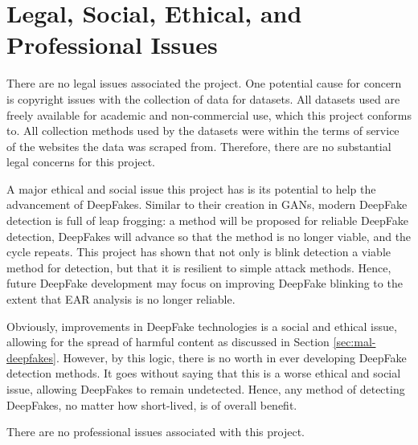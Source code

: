 \section{Legal, Social, Ethical, and Professional Issues}


There are no legal issues associated the project. One potential cause for concern is copyright issues with the collection of data for datasets. All datasets used are freely available for academic and non-commercial use, which this project conforms to. All collection methods used by the datasets were within the terms of service of the websites the data was scraped from. Therefore, there are no substantial legal concerns for this project.

A major ethical and social issue this project has is its potential to help the advancement of DeepFakes. Similar to their creation in GANs, modern DeepFake detection is full of leap frogging: a method will be proposed for reliable DeepFake detection, DeepFakes will advance so that the method is no longer viable, and the cycle repeats. This project has shown that not only is blink detection a viable method for detection, but that it is resilient to simple attack methods. Hence, future DeepFake development may focus on improving DeepFake blinking to the extent that EAR analysis is no longer reliable. 

Obviously, improvements in DeepFake technologies is a social and ethical issue, allowing for the spread of harmful content as discussed in Section \ref{sec:mal-deepfakes}. However, by this logic, there is no worth in ever developing DeepFake detection methods. It goes without saying that this is a worse ethical and social issue, allowing DeepFakes to remain undetected. Hence, any method of detecting DeepFakes, no matter how short-lived, is of overall benefit.

There are no professional issues associated with this project.